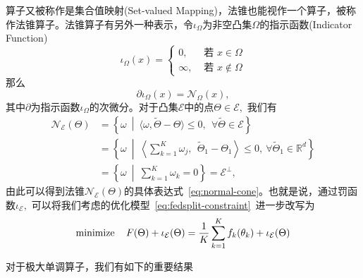 算子又被称作是集合值映射(Set-valued Mapping)，法锥也能视作一个算子，被称作法锥算子。法锥算子有另外一种表示，令$\iota_{\Omega}$为非空凸集$\Omega$的指示函数(Indicator Function)
\begin{equation*}
\iota_{\Omega} (x) = \begin{cases}
0, & \text{ 若 } x \in \Omega \\
\infty, & \text{ 若 } x \not\in \Omega
\end{cases}
\end{equation*}
那么
\begin{equation*}
\partial \iota_{\Omega}(x) = \mathcal{N}_{\Omega}(x),
\end{equation*}
其中$\partial$为指示函数$\iota_{\Omega}$的次微分。对于凸集$\mathcal{E}$中的点$\Theta \in \mathcal{E},$ 我们有
\begin{align*}
\mathcal{N}_{\mathcal{E}}(\Theta) & = \left\{ \omega \ \middle|\ \langle \omega, \widetilde{\Theta} - \Theta \rangle \leqslant 0, ~~ \forall \widetilde{\Theta} \in {\mathcal{E}} \right\} \\
& = \left\{ \omega \ \middle|\ \left\langle \sum\limits_{k=1}^K \omega_j, ~~ \widetilde{\Theta}_1 - \Theta_1 \right\rangle \leqslant 0, \ \forall \widetilde{\Theta}_1 \in \mathbb{R}^d \right\} \\
& = \left\{ \omega \ \middle|\ \sum\limits_{k=1}^K \omega_k = 0 \right\} = {\mathcal{E}}^{\perp},
\end{align*}
由此可以得到法锥$\mathcal{N}_{\mathcal{E}}(\Theta)$的具体表达式~\eqref{eq:normal-cone}。也就是说，通过罚函数$\iota_{\mathcal{E}},$ 可以将我们考虑的优化模型~\eqref{eq:fedsplit-constraint}~进一步改写为
\begin{equation}
\label{eq:fedsplit-pen}
\operatorname*{minimize} \quad F(\Theta) + \iota_{\mathcal{E}}(\Theta) = \frac{1}{K} \sum\limits_{k=1}^K f_k(\theta_k) + \iota_{\mathcal{E}}(\Theta)
\end{equation}

对于极大单调算子，我们有如下的重要结果


